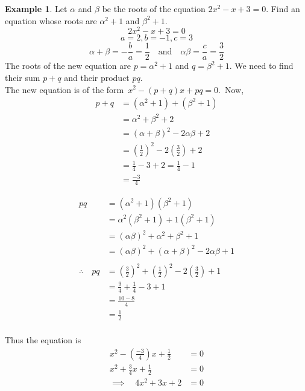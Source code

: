 \documentclass[11pt,a4paper]{article}
\theoremstyle{definition}
\newtheorem{example}[thm]{Example}
\begin{document}
\begin{example}

Let $\alpha$ and $\beta$ be the roots of the equation $2x^2-x+3=0$. Find an equation whose roots are $\alpha^2+1$ and $\beta^2+1$. $$2x^2-x+3=0$$ $$a=2, b=-1, c=3$$ $$\alpha+\beta=-\frac{b}{a}=\frac{1}{2}\quad \text{and}\quad  \alpha \beta = \frac{c}{a}=\frac{3}{2}$$
The roots of the new equation are $p=\alpha^2+1$ and $q=\beta^2+1$. We need to find their sum $p+q$ and their product $pq$.\\

The new equation is of the form  \,$x^2-(p+q)x+pq=0$.\,
Now,
\begin{align*}
p+q & =(\alpha^2+1)+(\beta^2+1)\\
    & = \alpha^2+\beta^2+2\\
    & = (\alpha +\beta)^2-2\alpha \beta +2\\
    & = \left(\frac{1}{2}\right)^2-2\left(\frac{3}{2}\right)+2\\
    & = \frac{1}{4}-3+2=\frac{1}{4}-1\\
    & = \frac{-3}{4}
\end{align*}


\begin{align*}
pq & =(\alpha^2+1)(\beta^2+1)\\
   & = \alpha^2(\beta^2+1)+1(\beta^2+1)\\
   & = (\alpha \beta)^2+\alpha^2+\beta^2+1\\
   & = (\alpha \beta)^2+(\alpha+\beta)^2-2\alpha \beta +1\\\\
\therefore \quad  pq & = \left(\frac{3}{2}\right)^2+\left(\frac{1}{2}\right)^2-2\left(\frac{3}{2}\right)+1\\
                             & = \frac{9}{4}+\frac{1}{4}-3+1\\
                             & = \frac{10-8}{4}\\
                             & = \frac{1}{2}\\
\end{align*}


Thus the equation is
\begin{align*}
x^2-\left(\frac{-3}{4}\right)x+\frac{1}{2} & = 0\\
x^2+\frac{3}{4}x+\frac{1}{2} & = 0\\
\implies \quad  4x^2+3x+2 & =0\\
\end{align*}
\end{example}
\end{document}
